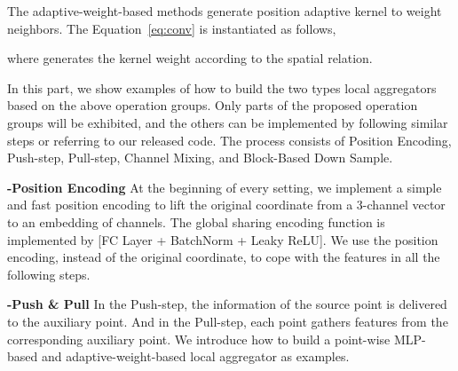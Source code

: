\documentclass[journal]{IEEEtran}
\begin{document}
\noindent
The adaptive-weight-based methods generate position adaptive kernel to weight neighbors. The Equation~\ref{eq:conv} is instantiated as follows,



 \noindent
 where  generates the kernel weight according to the spatial relation.
 
In this part, we show examples of how to build the two types local aggregators based on the above operation groups. Only parts of the proposed operation groups will be exhibited, and the others can be implemented by following similar steps or referring to our released code. The process consists of Position Encoding, Push-step, Pull-step, Channel Mixing, and Block-Based Down Sample.


\noindent
{\bf -Position Encoding} At the beginning of every setting, we implement a simple and fast position encoding to lift the original coordinate from a 3-channel vector to an embedding of  channels. The global sharing encoding function  is implemented by [FC Layer + BatchNorm + Leaky ReLU]. We use the position encoding, instead of the original coordinate, to cope with the features in all the following steps.

\noindent
{\bf -Push \& Pull} In the Push-step, the information of the source point is delivered to the auxiliary point. And in the Pull-step, each point gathers features from the corresponding auxiliary point. We introduce how to build a point-wise MLP-based and adaptive-weight-based local aggregator as examples.
\end{document}
